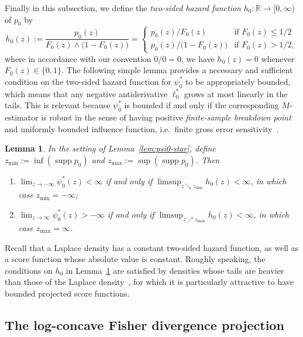 \documentclass[a4paper]{article}
\DeclareMathOperator{\supp}{supp}
\newtheorem{lemma}[theorem]{Lemma}
\theoremstyle{definition}
\begin{document}
Finally in this subsection, we define the \emph{two-sided hazard function} $h_0 \colon \mathbb{R} \rightarrow [0,\infty)$ of $p_0$ by
\begin{equation}
\label{eq:two-sided-hazard}
h_0(z) := \frac{p_0(z)}{F_0(z) \wedge \bigl(1 - F_0(z)\bigr)} =
\begin{cases}
p_0(z)/F_0(z) & \text{if }F_0(z) \leq 1/2 \\
p_0(z)/\bigl(1 - F_0(z)\bigr) & \text{if }F_0(z) > 1/2,
\end{cases}
\end{equation}
where in accordance with our convention $0/0 = 0$, we have $h_0(z) = 0$ whenever $F_0(z) \in \{0,1\}$. The following simple lemma provides a necessary and sufficient condition on the two-sided hazard function for $\psi_0^*$ to be appropriately bounded, which means that any negative antiderivative $\ell_0^*$ grows at most linearly in the tails.  This is relevant because $\psi_0^*$ is bounded if and only if the corresponding $M$-estimator is robust in the sense of having positive \emph{finite-sample breakdown point} and uniformly bounded influence function, i.e.~finite gross error sensitivity~\citep[Sections~2.2 and~2.3]{hampel2011robust}.
\begin{lemma}
\label{lem:hazard}
In the setting of Lemma~\ref{lem:psi0-star}, define $z_{\min} := \inf(\supp p_0)$ and $z_{\max} := \sup(\supp p_0)$. Then
\begin{enumerate}[label=(\alph*)]
\item $\lim_{z \to -\infty}\psi_0^*(z) < \infty$ if and only if $\limsup_{z \searrow z_{\min}} h_0(z) < \infty$, in which case $z_{\min} = -\infty$;
\item $\lim_{z \to \infty}\psi_0^*(z) > -\infty$ if and only if $\limsup_{z \nearrow z_{\max}} h_0(z) < \infty$, in which case $z_{\max} = \infty$.
\end{enumerate}
\end{lemma}
Recall that a Laplace density has a constant two-sided hazard function, as well as a score function whose absolute value is constant. Roughly speaking, the conditions on $h_0$ in Lemma~\ref{lem:hazard} are satisfied by densities whose tails are heavier than those of the Laplace density~\citep{samworth2004convergence}, for which it is particularly attractive to have bounded projected score functions.

\subsection{The log-concave Fisher divergence projection}
\label{subsec:fisher-divergence-proj}
\end{document}
